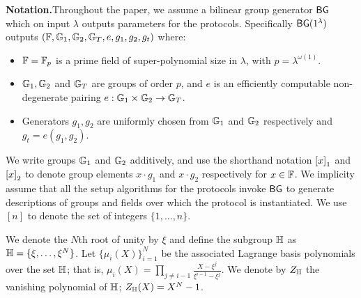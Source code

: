 
\noindent\textbf{Notation.}Throughout the paper, we assume a bilinear group generator $\mathsf{BG}$ which on input $\lambda$ outputs
parameters for the protocols. Specifically $\mathsf{BG}(1^{\lambda})$ outputs $(\mathbb{F},\mathbb{G}_1,\mathbb{G}_2,\mathbb{G}_T, e, g_1, g_2,g_t)$
where:
\begin{itemize}[leftmargin=2em, label=-]
	\item $\mathbb{F}={\mathbb{F}_p}$ is a prime field of super-polynomial size in $\lambda$, with $p=\lambda^{\omega(1)}$.
	\item $\mathbb{G}_1,\mathbb{G}_2$ and $\mathbb{G}_T$ are groups of order $p$, and $e$ is an efficiently computable non-degenerate
	pairing $e:\mathbb{G}_1\times \mathbb{G}_2\rightarrow \mathbb{G}_T$.
	\item Generators $g_1,g_2$ are uniformly chosen from $\mathbb{G}_1$ and $\mathbb{G}_2$ respectively and $g_t=e(g_1,g_2)$.
\end{itemize}
We write groups $\mathbb{G}_1$ and $\mathbb{G}_2$ additively, and use the shorthand notation $\left[{x}\right]_1$ and $\left[{x}\right]_2$
to denote group elements $x\cdot g_1$ and $x\cdot g_2$ respectively for $x\in \mathbb{F}$. We implicity assume
that all the setup algorithms for the protocols invoke $\mathsf{BG}$ to generate descriptions of groups and fields
over which the protocol is instantiated. We use $[n]$ to denote the set of integers $\{1,\ldots,n\}$.

We denote the $N$th root of unity by $\xi$ and define the subgroup $\mathbb{H}$ as $\mathbb{H} =\{\xi,\ldots,\xi^N\}$. 
Let $\{\mu_i(X)\}_{i=1}^N$ be the associated
Lagrange basis polynomials over the set $\mathbb{H}$; that is, $\mu_i(X) = \prod_{j\neq i-1} \frac{X-\xi^j}{\xi^{i-1}-\xi^j}$.
We denote by $Z_{\mathbb{H}}$ the vanishing polynomial of $\mathbb{H}$;  $Z_{\mathbb{H}}(X)=X^N-1$.

